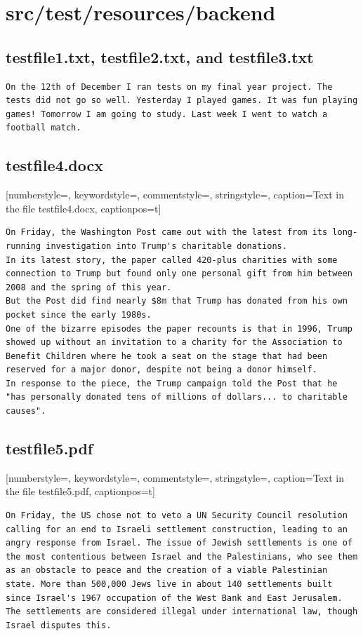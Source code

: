 \section{src/test/resources/backend}
\subsection{testfile1.txt, testfile2.txt, and testfile3.txt}
\begin{lstlisting}[numberstyle=\tiny\color{black},  keywordstyle=\color{black},  commentstyle=\color{black},  stringstyle=\color{black}, caption={Text in the files testfile1.txt, testfile2.txt and testfile3.txt}, captionpos=t]
On the 12th of December I ran tests on my final year project. The tests did not go so well. Yesterday I played games. It was fun playing games! Tomorrow I am going to study. Last week I went to watch a football match.
\end{lstlisting}
\subsection{testfile4.docx}[numberstyle=\tiny\color{black},  keywordstyle=\color{black},  commentstyle=\color{black},  stringstyle=\color{black}, caption={Text in the file testfile4.docx}, captionpos=t]
\begin{lstlisting}
On Friday, the Washington Post came out with the latest from its long-running investigation into Trump's charitable donations. 
In its latest story, the paper called 420-plus charities with some connection to Trump but found only one personal gift from him between 2008 and the spring of this year. 
But the Post did find nearly $8m that Trump has donated from his own pocket since the early 1980s.
One of the bizarre episodes the paper recounts is that in 1996, Trump showed up without an invitation to a charity for the Association to Benefit Children where he took a seat on the stage that had been reserved for a major donor, despite not being a donor himself. 
In response to the piece, the Trump campaign told the Post that he "has personally donated tens of millions of dollars... to charitable causes".
\end{lstlisting}
\subsection{testfile5.pdf}[numberstyle=\tiny\color{black},  keywordstyle=\color{black},  commentstyle=\color{black},  stringstyle=\color{black}, caption={Text in the file testfile5.pdf}, captionpos=t]
\begin{lstlisting}
On Friday, the US chose not to veto a UN Security Council resolution calling for an end to Israeli settlement construction, leading to an angry response from Israel. The issue of Jewish settlements is one of the most contentious between Israel and the Palestinians, who see them as an obstacle to peace and the creation of a viable Palestinian state. More than 500,000 Jews live in about 140 settlements built since Israel's 1967 occupation of the West Bank and East Jerusalem. The settlements are considered illegal under international law, though Israel disputes this.
\end{lstlisting}

